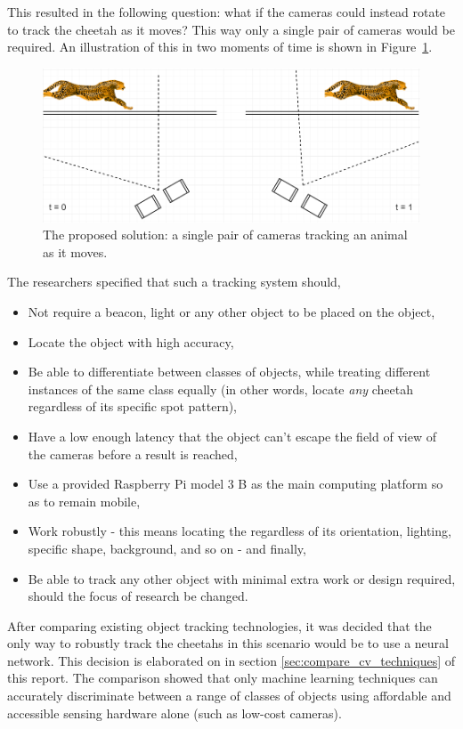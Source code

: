 This resulted in the following question: what if the cameras could instead rotate to track the cheetah as it moves? This way only a single pair of cameras would be required. An illustration of this in two moments of time is shown in Figure~\ref{fig:single_gopro_pair}.

\begin{figure}[h!]
  \centering
  \includegraphics[width=\textwidth]{single_gopro_pair}
  \caption{\label{fig:single_gopro_pair} The proposed solution: a single pair of cameras tracking an animal as it moves.}
\end{figure}

The researchers specified that such a tracking system should,

\begin{itemize}
	\item Not require a beacon, light or any other object to be placed on the object,
	\item Locate the object with high accuracy,
	\item Be able to differentiate between classes of objects, while treating different instances of the same class equally (in other words, locate \emph{any} cheetah regardless of its specific spot pattern),
	\item Have a low enough latency that the object can't escape the field of view of the cameras before a result is reached,
	\item Use a provided Raspberry Pi model 3 B as the main computing platform so as to remain mobile,
	\item Work robustly - this means locating the regardless of its orientation, lighting, specific shape, background, and so on - and finally,
	\item Be able to track any other object with minimal extra work or design required, should the focus of research be changed.
\end{itemize}

After comparing existing object tracking technologies, it was decided that the only way to robustly track the cheetahs in this scenario would be to use a neural network. This decision is elaborated on in section \ref{sec:compare_cv_techniques} of this report. The comparison showed that only machine learning techniques can accurately discriminate between a range of classes of objects using affordable and accessible sensing hardware alone (such as low-cost cameras).


